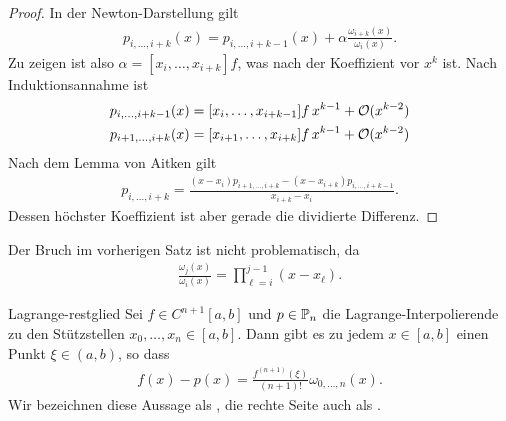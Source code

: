 \begin{proof}
  In der Newton-Darstellung gilt
  \begin{gather}
    p_{i,\dots,i+k}(x) = p_{i,\dots,i+k-1}(x)
    + \alpha \frac{\omega_{i+k}(x)}{\omega_i(x)}.
  \end{gather}
  Zu zeigen ist also $\alpha = [x_i,\dots,x_{i+k}]f$, was nach
   der Koeffizient vor $x^k$ ist. Nach
  Induktionsannahme ist
  \begin{gather}
    \begin{split}
      p_{i,\dots,i+k-1}(x) &= [x_i,\dots,x_{i+k-1}]f \,x^{k-1} +\bigo(x^{k-2})\\
      p_{i+1,\dots,i+k}(x) &= [x_{i+1},\dots,x_{i+k}]f \,x^{k-1} +\bigo(x^{k-2})
    \end{split}
  \end{gather}
  Nach dem Lemma von Aitken gilt
  \begin{gather}
    p_{i,\dots,i+k} = \frac{(x-x_i)p_{i+1,\dots,i+k}
      - (x-x_{i+k})p_{i,\dots,i+k-1}}{x_{i+k} - x_i}.
  \end{gather}
  Dessen höchster Koeffizient ist aber gerade die dividierte Differenz.
\end{proof}

\begin{remark}
  Der Bruch im vorherigen Satz ist nicht problematisch, da
  \begin{gather}
    \frac{\omega_j(x)}{\omega_i(x)} = \prod_{\ell=i}^{j-1} (x-x_\ell).
  \end{gather}
\end{remark}

\begin{Satz}{Lagrange-restglied}
  Sei $f \in C^{n+1}[a,b]$ und $p\in \P_n$ die
  Lagrange-Interpolierende zu den Stützstellen
  $x_0,\dots,x_n\in [a,b]$. Dann gibt es zu jedem $x\in [a,b]$ einen Punkt
  $\xi \in (a,b)$, so dass
  \begin{gather}
    f(x)- p(x) = \frac{f^{(n+1)}(\xi)}{(n+1)!} \omega_{0,\dots,n}(x).
  \end{gather}
  Wir bezeichnen diese Aussage als , die
  rechte Seite auch als .
\end{Satz}

